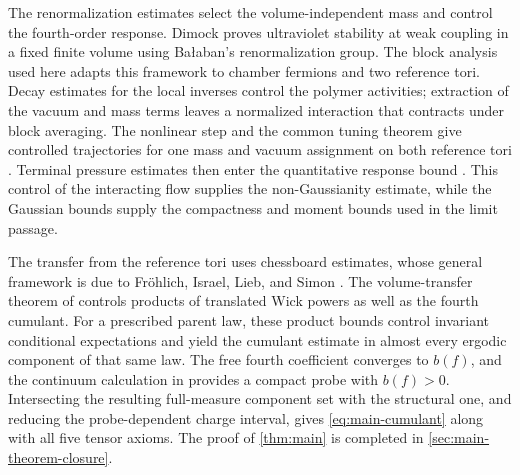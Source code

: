 The renormalization estimates select the volume-independent mass
and control the fourth-order response. Dimock \cite{DimockUVS2022}
proves ultraviolet stability at weak coupling in a fixed finite
volume using Ba{\l}aban's renormalization group. The block analysis
used here adapts this framework to chamber fermions and two
reference tori. Decay estimates for the local inverses control the
polymer activities; extraction of the vacuum and mass terms leaves
a normalized interaction that contracts under block averaging.
The nonlinear step and the common tuning theorem give controlled
trajectories for one mass and vacuum assignment on both reference
tori \cite{NormalizedContraction,NonlinearStep,CoverTuning}.
Terminal pressure estimates then enter the quantitative response
bound \cite{TerminalPressure,ReferenceResponse}. This control of
the interacting flow supplies the non-Gaussianity estimate, while
the Gaussian bounds supply the compactness and moment bounds used
in the limit passage.

The transfer from the reference tori uses chessboard estimates,
whose general framework is due to Fr\"ohlich, Israel, Lieb, and
Simon \cite{FILS1978}. The volume-transfer theorem of
\cite{VolumeTransfer} controls products of translated Wick
powers as well as the fourth cumulant. For a prescribed parent law,
these product bounds control invariant conditional expectations
and yield the cumulant estimate in almost every ergodic component
of that same law. The free fourth coefficient converges to $b(f)$,
and the continuum calculation in \cite{PositiveProbe} provides a
compact probe with $b(f)>0$. Intersecting the resulting full-measure
component set with the structural one, and reducing the
probe-dependent charge interval, gives \eqref{eq:main-cumulant}
along with all five tensor axioms.
The proof of \cref{thm:main} is completed in
\cref{sec:main-theorem-closure}.
